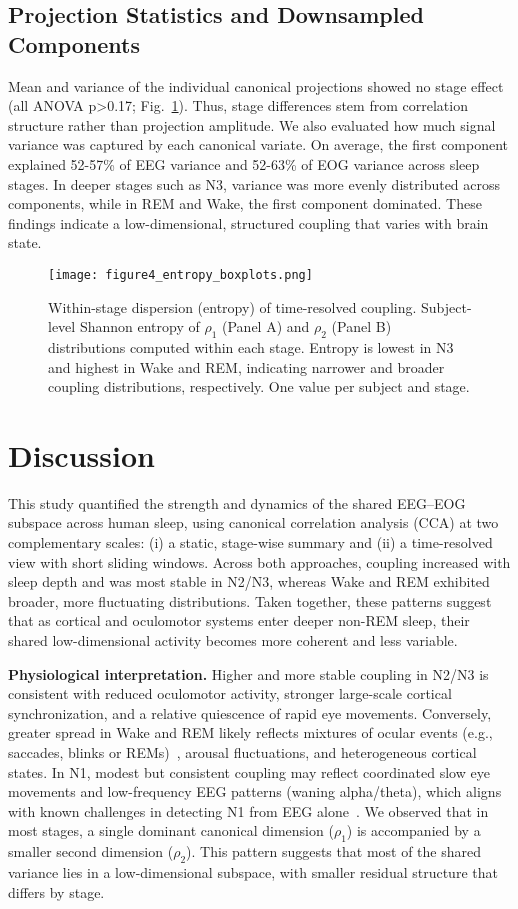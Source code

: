 \subsection{Projection Statistics and Downsampled Components}
\vspace{0pt}%
Mean and variance of the individual canonical projections showed no stage effect (all ANOVA p>0.17; Fig.~\ref{fig:figure4}). Thus, stage differences stem from correlation structure rather than projection amplitude.
We also evaluated how much signal variance was captured by each canonical variate. On average, the first component explained 52-57\% of EEG variance and 52-63\% of EOG variance across sleep stages. In deeper stages such as N3, variance was more evenly distributed across components, while in REM and Wake, the first component dominated. These findings indicate a low-dimensional, structured coupling that varies with brain state.%
\begin{figure}[!t]
\centering
\texttt{[image: figure4\_entropy\_boxplots.png]}%
\caption{Within-stage dispersion (entropy) of time-resolved coupling. Subject-level Shannon entropy of $\rho_1$ (Panel A) and $\rho_2$ (Panel B) distributions computed within each stage. Entropy is lowest in N3 and highest in Wake and REM, indicating narrower and broader coupling distributions, respectively. One value per subject and stage.}\label{fig:figure4}
\end{figure}%
\vspace{0pt}%

\section{Discussion}
This study quantified the strength and dynamics of the shared EEG--EOG subspace across human sleep, using canonical correlation analysis (CCA) at two complementary scales: (i) a static, stage-wise summary and (ii) a time-resolved view with short sliding windows. Across both approaches, coupling increased with sleep depth and was most stable in N2/N3, whereas Wake and REM exhibited broader, more fluctuating distributions. Taken together, these patterns suggest that as cortical and oculomotor systems enter deeper non-REM sleep, their shared low-dimensional activity becomes more coherent and less variable.

\textbf{Physiological interpretation.}
Higher and more stable coupling in N2/N3 is consistent with reduced oculomotor activity, stronger large-scale cortical synchronization, and a relative quiescence of rapid eye movements. Conversely, greater spread in Wake and REM likely reflects mixtures of ocular events (e.g., saccades, blinks or REMs)~\cite{hobson2010, mccarley1994}, arousal fluctuations, and heterogeneous cortical states. In N1, modest but consistent coupling may reflect coordinated slow eye movements and low-frequency EEG patterns (waning alpha/theta), which aligns with known challenges in detecting N1 from EEG alone~\cite{xu2025}. We observed that in most stages, a single dominant canonical dimension ($\rho_1$) is accompanied by a smaller second dimension ($\rho_2$). This pattern suggests that most of the shared variance lies in a low-dimensional subspace, with smaller residual structure that differs by stage.

